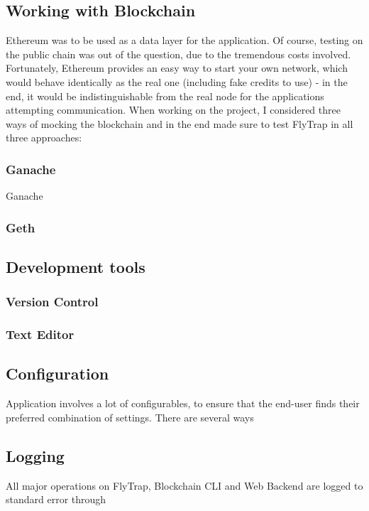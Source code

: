 \subsection{Working with Blockchain}
Ethereum was to be used as a data layer for the application. Of course, testing on the public chain was out of the question, due to the tremendous costs involved. Fortunately, Ethereum provides an easy way to start your own network, which would behave identically as the real one (including fake credits to use) - in the end, it would be indistinguishable from the real node for the applications attempting communication. When working on the project, I considered three ways of mocking the blockchain and in the end made sure to test FlyTrap in all three approaches:
\subsubsection{Ganache}
Ganache \cite{lee2019testing}
\subsubsection{Geth}

\subsection{Development tools}
\subsubsection{Version Control}
\subsubsection{Text Editor}

\subsection{Configuration}
Application involves a lot of configurables, to ensure that the end-user finds their preferred combination of settings. There are several ways 

\subsection{Logging}
All major operations on FlyTrap, Blockchain CLI and Web Backend are logged to standard error through 
